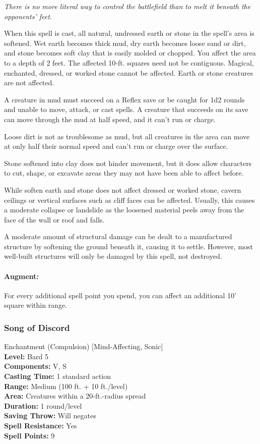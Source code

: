 \emph{There is no more literal way to control the battlefield than to melt it beneath the opponents' feet.}

When this spell is cast, all natural, undressed earth or stone in the spell's area is softened. 
Wet earth becomes thick mud, dry earth becomes loose sand or dirt, and stone becomes soft clay that is easily molded or chopped. 
You affect the area to a depth of 2 feet. The affected 10-ft. squares need not be contiguous.
Magical, enchanted, dressed, or worked stone cannot be affected. Earth or stone creatures are not affected.

A creature in mud must succeed on a Reflex save or be caught for 1d2 rounds and unable to move, attack, or cast spells. 
A creature that succeeds on its save can move through the mud at half speed, and it can't run or charge.

Loose dirt is not as troublesome as mud, but all creatures in the area can move at only half their normal speed and can't run or charge over the surface.

Stone softened into clay does not hinder movement, but it does allow characters to cut, shape, or excavate areas they may not have been able to affect before.

While soften earth and stone does not affect dressed or worked stone, cavern ceilings or vertical surfaces such as cliff faces can be affected. 
Usually, this causes a moderate collapse or landslide as the loosened material peels away from the face of the wall or roof and falls.

A moderate amount of structural damage can be dealt to a manufactured structure by softening the ground beneath it, causing it to settle.
However, most well-built structures will only be damaged by this spell, not destroyed.

\paragraph{Augment:} For every additional spell point you spend, you can affect an additional 10' square within range.
\subsubsection{Song of Discord}
\label{Spell:SongOfDiscord}
Enchantment (Compulsion) [Mind-Affecting, Sonic]
\\ \textbf{Level:} Bard 5
\\ \textbf{Components:} V, S
\\ \textbf{Casting Time:} 1 standard action
\\ \textbf{Range:} Medium (100 ft. + 10 ft./level)
\\ \textbf{Area:} Creatures within a 20-ft.-radius spread
\\ \textbf{Duration:} 1 round/level
\\ \textbf{Saving Throw:} Will negates
\\ \textbf{Spell Resistance:} Yes
\\ \textbf{Spell Points:} 9

